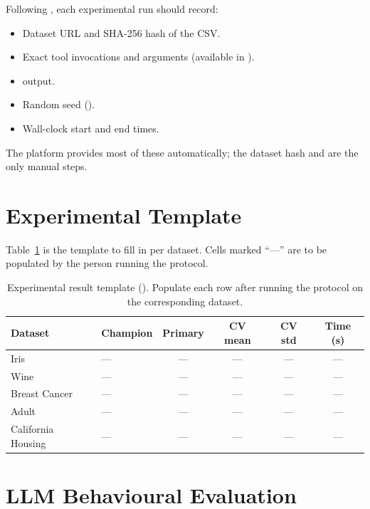 Following \citet{pineau2021reproducibility}, each experimental run
should record:

\begin{itemize}[leftmargin=1.4em]
  \item Dataset URL and SHA-256 hash of the CSV.
  \item Exact tool invocations and arguments (available in
        ).
  \item {} output.
  \item Random seed ().
  \item Wall-clock start and end times.
\end{itemize}

The platform provides most of these automatically; the dataset hash
and  are the only manual steps.

\section{Experimental Template}
\label{sec:template}

Table~\ref{tab:experiment-template} is the template to fill in per
dataset. Cells marked ``---'' are to be populated by the person
running the protocol.

\begin{table}[H]
\centering
\caption{Experimental result template (\exper{}). Populate each
row after running the protocol on the corresponding dataset.}
\label{tab:experiment-template}
\small
\begin{tabularx}{\linewidth}{@{}lXcccc@{}}
\toprule
\textbf{Dataset} & \textbf{Champion} & \textbf{Primary} & \textbf{CV mean} & \textbf{CV std} & \textbf{Time (s)} \\
\midrule
Iris & --- & --- & --- & --- & --- \\
Wine & --- & --- & --- & --- & --- \\
Breast Cancer & --- & --- & --- & --- & --- \\
Adult & --- & --- & --- & --- & --- \\
California Housing & --- & --- & --- & --- & --- \\
\bottomrule
\end{tabularx}
\end{table}

\section{LLM Behavioural Evaluation}
\label{sec:llm-eval}

